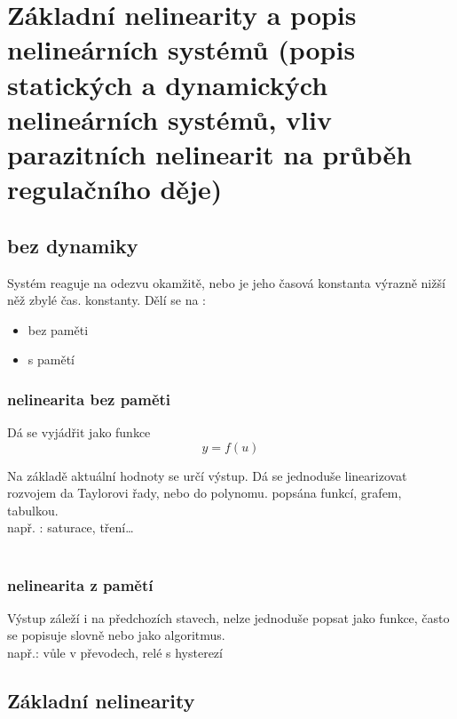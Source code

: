 \section{Základní nelinearity a popis nelineárních systémů (popis statických a dynamických nelineárních systémů,
vliv parazitních nelinearit na průběh regulačního děje)}


\subsection{bez dynamiky}
Systém reaguje na odezvu okamžitě, nebo je jeho časová konstanta výrazně nižší něž zbylé čas. konstanty.
Dělí se na :

\begin{itemize}
    \item bez paměti
    \item s pamětí
\end{itemize}

\subsubsection*{nelinearita bez paměti}

Dá se vyjádřit jako funkce 
\begin{equation}
    y=f(u)
\end{equation}

Na základě aktuální hodnoty se určí výstup. Dá se jednoduše linearizovat rozvojem da Taylorovi řady, nebo do polynomu.
popsána funkcí, grafem, tabulkou.
\\
např. :  saturace, tření\dots
\\
\\
\subsubsection*{nelinearita z pamětí}
Výstup záleží i na předchozích stavech, nelze jednoduše popsat jako funkce, často se popisuje slovně nebo jako algoritmus.
\\
např.: vůle v převodech, relé s hysterezí

\subsection*{Základní nelinearity}

